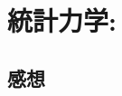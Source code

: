 \documentclass[../../sp_2018.tex]{subfiles}
\begin{document}
\setcounter{section}{1}
\section{統計力学:}
\subsection{}



\subsection*{感想}
\end{document}
